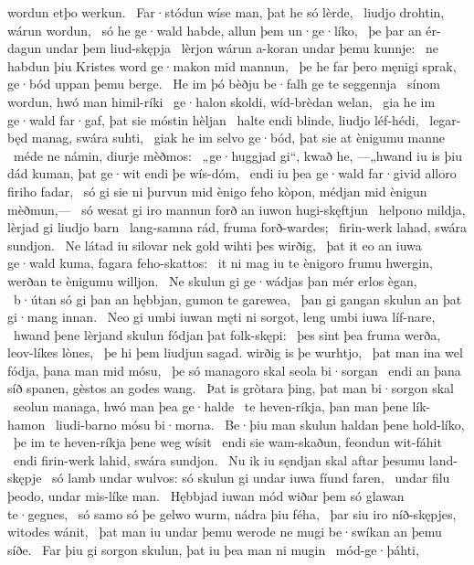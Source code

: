 wordun etþo werkun. \hld\ Far·stódun wíse man,
þat he só lèrde, \hld\ liudjo drohtin,
wárun wordun, \hld\ só he ge·wald habde,
allun þem un·ge·líko, \hld\ þe þar an ér-dagun
undar þem liud-skępja \hld\ lèrjon wárun
a-koran undar þemu kunnje: \hld\ ne habdun þiu Kristes word
ge·makon mid mannun, \hld\ þe he far þero męnigi sprak,
ge·bód uppan þemu berge. \hld\ He im þó bèðju be·falh
ge te seggennja \hld\ sínom wordun,
hwó man himil-ríki \hld\ ge·halon skoldi,
wíd-brèdan welan, \hld\ gia he im ge·wald far·gaf,
þat sie móstin hèljan \hld\ halte endi blinde,
liudjo léf-hédi, \hld\ legar-będ manag,
swára suhti, \hld\ giak he im selvo ge·bód,
þat sie at ènigumu manne \hld\ méde ne námin,
diurje mèðmos: \hld\ „ge·huggjad gi“, kwað he, —„hwand iu is þiu dád kuman,
þat ge·wit endi þe wís-dóm, \hld\ endi iu þea ge·wald far·givid
alloro firiho fadar, \hld\ só gi sie ni þurvun mid ènigo feho kòpon,
médjan mid ènigun mèðmun,— \hld\ só wesat gi iro mannun forð
an iuwon hugi-skęftjun \hld\ helpono mildja,
lèrjad gi liudjo barn \hld\ lang-samna rád,
fruma forð-wardes; \hld\ firin-werk lahad,
swára sundjon. \hld\ Ne látad iu silovar nek gold
wihti þes wirðig, \hld\ þat it eo an iuwa ge·wald kuma,
fagara feho-skattos: \hld\ it ni mag iu te ènigoro frumu hwergin,
werðan te ènigumu willjon. \hld\ Ne skulun gi ge·wádjas þan mér
erlos ègan, \hld\ b·útan só gi þan an hębbjan,
gumon te garewea, \hld\ þan gi gangan skulun
an þat gi·mang innan. \hld\ Neo gi umbi iuwan męti ni sorgot,
leng umbi iuwa líf-nare, \hld\ hwand þene lèrjand skulun
fódjan þat folk-skępi: \hld\ þes sint þea fruma werða,
leov-líkes lònes, \hld\ þe hi þem liudjun sagad.
wirðig is þe wurhtjo, \hld\ þat man ina wel fódja,
þana man mid mósu, \hld\ þe só managoro skal
seola bi·sorgan \hld\ endi an þana síð spanen,
gèstos an godes wang. \hld\ Þat is gròtara þing,
þat man bi·sorgon skal \hld\ seolun managa,
hwó man þea ge·halde \hld\ te heven-ríkja,
þan man þene lík-hamon \hld\ liudi-barno
mósu bi·morna. \hld\ Be·þiu man skulun
haldan þene hold-líko, \hld\ þe im te heven-ríkja
þene weg wísit \hld\ endi sie wam-skaðun,
feondun wit-fáhit \hld\ endi firin-werk lahid,
swára sundjon. \hld\ Nu ik iu sęndjan skal
aftar þesumu land-skępje \hld\ só lamb undar wulvos:
só skulun gi undar iuwa fíund faren, \hld\ undar filu þeodo,
undar mis-líke man. \hld\ Hębbjad iuwan mód wiðar þem
só glawan te·gegnes, \hld\ só samo só þe gelwo wurm,
nádra þiu féha, \hld\ þar siu iro níð-skępjes,
witodes wánit, \hld\ þat man iu undar þemu werode ne mugi
be·swíkan an þemu síðe. \hld\ Far þiu gi sorgon skulun,
þat iu þea man ni mugin \hld\ mód-ge·þáhti,
